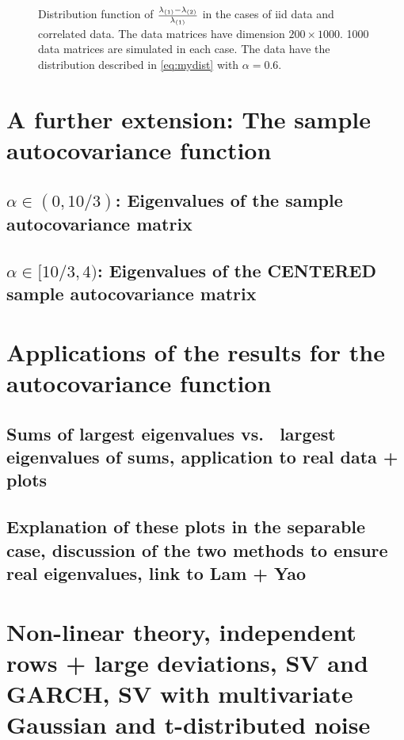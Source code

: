 \documentclass[11pt,reqno]{amsart}
\newcommand{\1}{\mathds{1}}
\newcommand{\0}{\boldsymbol{0}}
\newcommand{\4}{\mathchoice{\mskip1.5mu}{\mskip1.5mu}{}{}}
\newcommand{\5}{\mathchoice{\mskip-1.5mu}{\mskip-1.5mu}{}{}}
\newcommand{\2}{\penalty250\mskip\thickmuskip\mskip-\thinmuskip} %
\begin{document}
\begin{figure}[htb!]
{  }
  \caption{Distribution function of ${\lambda_{(1)} - \lambda_{(2)} \over
      \lambda_{(1)}}$ in the cases of iid data and correlated
    data. The data matrices have dimension $200 \times 1000$. 1000
    data matrices are simulated in each case. The data have the
    distribution described in \eqref{eq:mydist} with $\alpha=0.6$.}
  \label{fig:ProbMass}
\end{figure}

\section{A further extension: The sample autocovariance function}

\subsection{\texorpdfstring{$\alpha \in (0,10/3)$}{alpha in (0,10/3)}: Eigenvalues of the sample
  autocovariance matrix}
\subsection{\texorpdfstring{$\alpha \in [10/3,4)$}{alpha in [10/3,4)}: Eigenvalues of the CENTERED sample
  autocovariance matrix}

\section{Applications of the results for the autocovariance function}

\subsection{Sums of largest eigenvalues vs.~ largest eigenvalues of
  sums, application to real data + plots}
\subsection{Explanation of these plots in the separable case,
  discussion of the two methods to ensure real eigenvalues, link to
  Lam + Yao}

\section{Non-linear theory, independent rows + large deviations, SV
  and GARCH, SV with multivariate Gaussian and t-distributed noise}
\end{document}
